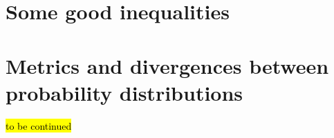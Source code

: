\documentclass[biber]{nowfnt} %
\newcommand{\tbc}{\noindent\hl{\sc{}to be continued}\xspace}
\begin{document}
%

\appendix

\chapter{Some good inequalities}
  \label{app:inequalities}


\chapter{Metrics and divergences between probability distributions}
  \label{app:distances}
\tbc
{}

\backmatter  %

\printbibliography
\end{document}
